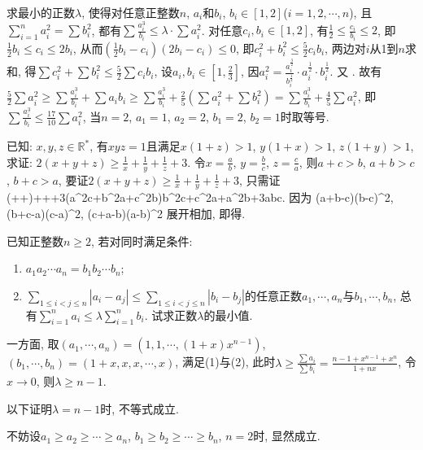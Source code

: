 \bq{}{}
求最小的正数$\lambda$, 使得对任意正整数$n$, $a_i$和$b_i$, $b_i\in[1,2]$($i=1,2,\cdots, n$), 且$\sum_{i=1}^{n}a_{i}^2=\sum b_i^2$, 
都有$\sum\frac{a_i^3}{b_i}\le\lambda\cdot\sum a_i^2$.
\eq
\ba
对任意$c_i, b_i\in[1,2]$, 有$\frac{1}{2}\le\frac{c_i}{b_i}\le 2$, 即$\frac{1}{2}b_i\le c_i\le2b_i$,
从而$\left(\frac{1}{2}b_i-c_i\right)(2b_i-c_i)\le0$, 即$c_i^2+b_i^2\le\frac{5}{2}c_ib_i$,
两边对$i$从1到$n$求和, 得$\sum c_i^2+\sum b_i^2\le\frac{5}{2}\sum c_ib_i$,
设$a_i, b_i\in\left[1, \frac{2}{3}\right]$, 因$a_i^2=\frac{a_i^{\frac{3}{2}}}{b_i^{\frac{1}{2}}}\cdot a_i^{\frac{1}{2}}\cdot b_i^{\frac{1}{2}}$.
又
\bee
{}\le{}.
\eee
故有$\frac{5}{2}\sum a_i^2\ge\sum\frac{a_i^3}{b_i}+\sum a_ib_i\ge\sum\frac{a_i^3}{b_i}+\frac{2}{5}(\sum a_i^2+\sum b_i^2)=\sum\frac{a_i^3}{b_i}+\frac{4}{5}\sum a_i^2$,
即$\sum\frac{a_i^3}{b_i}\le\frac{17}{10}\sum a_i^2$, 当$n=2$, $a_1=1$, $a_2=2$, $b_1=2$, $b_2=1$时取等号.
\ea

\bq{}{}
已知: $x,y,z\in\mathbb{R}^*$, 有$xyz=1$且满足$x(1+z)>1$, $y(1+x)>1$, $z(1+y)>1$, 
求证: $2(x+y+z)\ge\frac{1}{x}+\frac{1}{y}+\frac{1}{z}+3$.
\eq
\ba
令$x=\frac{a}{b}$, $y=\frac{b}{c}$, $z=\frac{c}{a}$, 则$a+c>b$, $a+b>c$, $b+c>a$, 要证$2(x+y+z)\ge\frac1x+\frac1y+\frac1z+3$, 只需证
\left(++\right)\ge{}+++3(a^2c+b^2a+c^2b)\ge b^2c+c^2a+a^2b+3abc.
\eee
因为
\bee
(a+b-c)(b-c)^2, \quad (b+c-a)(c-a)^2, \quad (c+a-b)(a-b)^2
\eee
展开相加, 即得.
\ea

\bq{}{}
已知正整数$n\ge 2$, 若对同时满足条件:
\begin{enumerate}[(1)]
 \item $a_1a_2\cdots a_n=b_1 b_2\cdots b_n$;
 \item $\sum_{1\le i<j\le n}|a_i-a_j|\le \sum_{1\le i<j\le n}|b_i-b_j|$的任意正数$a_1,\cdots, a_n$与$b_1,\cdots, b_n$,
 总有$\sum_{i=1}^{n}a_i\le\lambda\sum_{i=1}^{n}b_i$. 试求正数$\lambda$的最小值.
\end{enumerate}
\eq
\ba
一方面, 取$(a_1,\cdots, a_n)=(1,1,\cdots,(1+x)x^{n-1})$, $(b_1,\cdots,b_n)=(1+x,x,x,\cdots, x)$, 满足(1)与(2), 
此时$\lambda\ge\frac{\sum a_i}{\sum b_i}=\frac{n-1+x^{n-1}+x^n}{1+nx}$, 令$x\to0$, 则$\lambda\ge n-1$.

以下证明$\lambda=n-1$时, 不等式成立.

不妨设$a_1\ge a_2\ge\cdots\ge a_n$, $b_1\ge b_2\ge \cdots\ge b_n$, $n=2$时, 显然成立.

